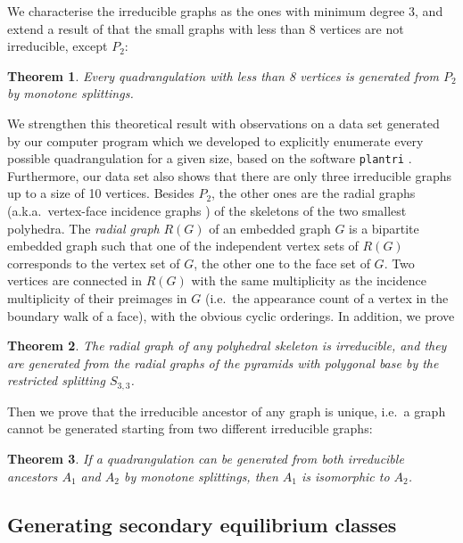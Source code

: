 \documentclass[]{article}
\newtheorem{theo}{Theorem}\newtheorem{prop}{Proposition}\newtheorem*{prop*}{Proposition}\newtheorem{coro}{Corollary}\newtheorem{lemm}{Lemma}\theoremstyle{definition}
\newcommand{\plantri}{{\tt plantri}\xspace}
\begin{document}
We characterise the irreducible graphs as the ones with minimum degree 3, and extend a result of \citet{Batagelj1989} that the small graphs with less than 8 vertices are not irreducible, except $P_2$:

\begin{theo}
  \label{theo:gomboc}
  Every quadrangulation with less than 8 vertices is generated from $P_2$ by monotone splittings.
\end{theo}

We strengthen this theoretical result with observations on a data set generated by our computer program which we developed to explicitly enumerate every possible quadrangulation for a given size, based on the software \plantri{} \cite{Brinkmann2007}.
Furthermore, our data set also shows that there are only three irreducible graphs up to a size of 10 vertices.
Besides $P_2$, the other ones are the radial graphs (a.k.a.\  vertex-face incidence graphs \cite{Mohar2001}) of the skeletons of the two smallest polyhedra.
The \emph{radial graph} $R(G)$ of an embedded graph $G$ is a bipartite embedded graph such that one of the independent vertex sets of $R(G)$ corresponds to the vertex set of $G$, the other one to the face set of $G$.
Two vertices are connected in $R(G)$ with the same multiplicity as the incidence multiplicity of their preimages in $G$ (i.e.\  the appearance count of a vertex in the boundary walk of a face), with the obvious cyclic orderings.
In addition, we prove

\begin{theo}
\label{theo:minpol}
The radial graph of any polyhedral skeleton is irreducible, and they are generated from the radial graphs of the pyramids with polygonal base by the restricted splitting $S_{3,3}$.
\end{theo}

Then we prove that the irreducible ancestor of any graph is unique, i.e.\  a graph cannot be generated starting from two different irreducible graphs:

\begin{theo}
  \label{theo:ancestor}
  If a quadrangulation can be generated from both irreducible ancestors $A_1$ and $A_2$ by monotone splittings, then $A_1$ is isomorphic to $A_2$.
\end{theo}


\subsection{Generating secondary equilibrium classes}
\end{document}
